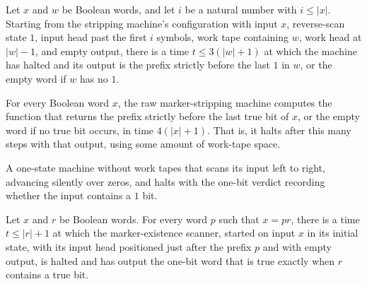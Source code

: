 \begin{lemma}
\label{Turing.FinTM.rawStrip_trim}
\leanok
{}
Let $x$ and $w$ be Boolean words, and let $i$ be a natural number with $i \le |x|$.
Starting from the stripping machine's configuration with input $x$, reverse-scan state
$1$, input head past the first $i$ symbols, work tape containing $w$, work head at
$|w|-1$, and empty output, there is a time $t \le 3(|w|+1)$ at which the machine has
halted and its output is the prefix strictly before the last $1$ in $w$, or the empty
word if $w$ has no $1$.
\end{lemma}

\begin{lemma}
\label{Turing.FinTM.rawStrip_computes}
\leanok
{}
For every Boolean word $x$, the raw marker-stripping machine computes the function that
returns the prefix strictly before the last true bit of $x$, or the empty word if no
true bit occurs, in time $4(|x|+1)$. That is, it halts after this many steps with that
output, using some amount of work-tape space.
\end{lemma}

\begin{definition}
\label{Turing.FinTM.anyTrueTM}
\leanok
{}
A one-state machine without work tapes that scans its input left to right,
advancing silently over zeros, and halts with the one-bit verdict recording
whether the input contains a $1$ bit.
\end{definition}

\begin{lemma}
\label{Turing.FinTM.anyTrue_run}
\leanok
{}
Let $x$ and $r$ be Boolean words. For every word $p$ such that $x=pr$, there is a time
$t\le |r|+1$ at which the marker-existence scanner, started on input $x$ in its initial
state, with its input head positioned just after the prefix $p$ and with empty output,
is halted and has output the one-bit word that is true exactly when $r$ contains a true
bit.
\end{lemma}

